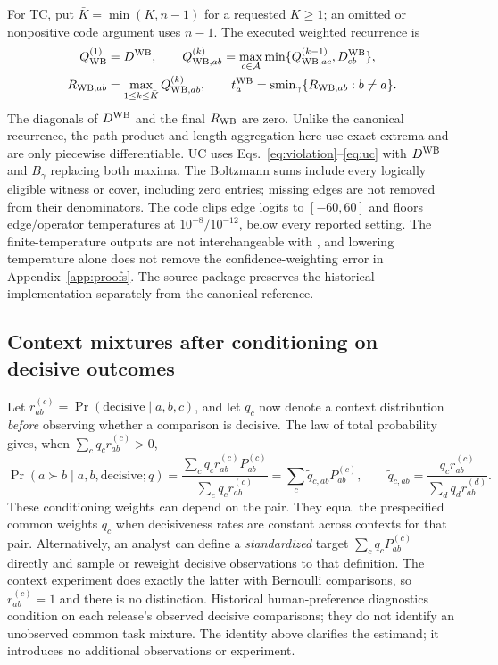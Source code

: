 For TC, put $\bar K=\min(K,n-1)$ for a requested $K\ge1$; an omitted or nonpositive code argument uses $n-1$. The executed weighted recurrence is
\begin{align}
Q_{\rm WB}^{(1)}&=D^{\rm WB},\qquad
Q_{{\rm WB},ab}^{(k)}=\max_{c\in\mathcal{A}}\min\{Q_{{\rm WB},ac}^{(k-1)},D^{\rm WB}_{cb}\},\nonumber\\
R_{{\rm WB},ab}&=\max_{1\le k\le\bar K}Q_{{\rm WB},ab}^{(k)},\qquad
t^{\rm WB}_a=\operatorname{smin}_\gamma\{R_{{\rm WB},ab}:b\ne a\}.\label{eq:historical-wb-tc}
\end{align}
The diagonals of $D^{\rm WB}$ and the final $R_{\rm WB}$ are zero. Unlike the canonical recurrence, the path product and length aggregation here use exact extrema and are only piecewise differentiable. UC uses Eqs.~\eqref{eq:violation}--\eqref{eq:uc} with $D^{\rm WB}$ and $B_\gamma$ replacing both maxima. The Boltzmann sums include every logically eligible witness or cover, including zero entries; missing edges are not removed from their denominators. The code clips edge logits to $[-60,60]$ and floors edge/operator temperatures at $10^{-8}/10^{-12}$, below every reported setting. The finite-temperature outputs are not interchangeable with \LSE, and lowering temperature alone does not remove the confidence-weighting error in Appendix~\ref{app:proofs}. The source package preserves the historical implementation separately from the canonical reference.

\subsection{Context mixtures after conditioning on decisive outcomes}\label{app:decisive-mixtures}
Let $r^{(c)}_{ab}=\Pr(\text{decisive}\mid a,b,c)$, and let $q_c$ now denote a context distribution \emph{before} observing whether a comparison is decisive. The law of total probability gives, when $\sum_c q_cr^{(c)}_{ab}>0$,
\[
\Pr(a\succ b\mid a,b,\text{decisive};q)
=\frac{\sum_c q_cr^{(c)}_{ab}P^{(c)}_{ab}}{\sum_c q_cr^{(c)}_{ab}}
=\sum_c\widetilde q_{c,ab}P^{(c)}_{ab},
\qquad
\widetilde q_{c,ab}=\frac{q_cr^{(c)}_{ab}}{\sum_d q_dr^{(d)}_{ab}}.
\]
These conditioning weights can depend on the pair. They equal the prespecified common weights $q_c$ when decisiveness rates are constant across contexts for that pair. Alternatively, an analyst can define a \emph{standardized} target $\sum_cq_cP^{(c)}_{ab}$ directly and sample or reweight decisive observations to that definition. The context experiment does exactly the latter with Bernoulli comparisons, so $r^{(c)}_{ab}=1$ and there is no distinction. Historical human-preference diagnostics condition on each release's observed decisive comparisons; they do not identify an unobserved common task mixture. The identity above clarifies the estimand; it introduces no additional observations or experiment.

